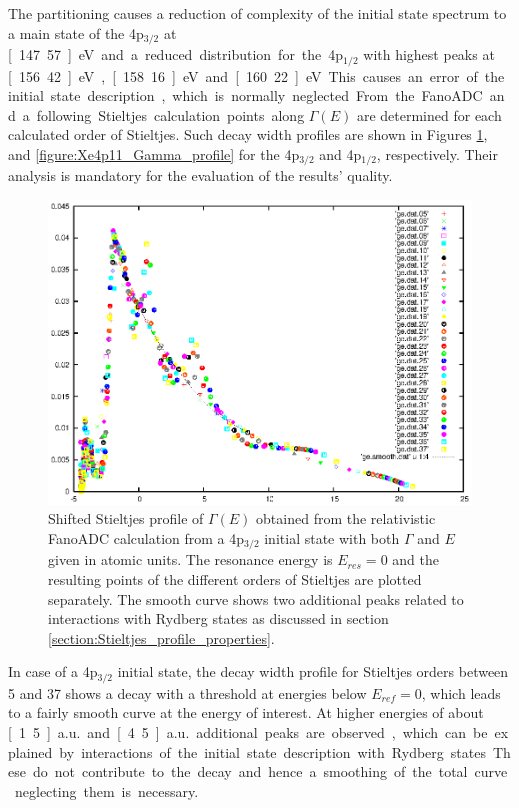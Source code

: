The partitioning causes a reduction of complexity of the initial state
spectrum to a main state of the 4p$_{3/2}$ at \unit[147.57]{eV} and a
reduced distribution for
the 4p$_{1/2}$ with highest peaks at \unit[156.42]{eV}, \unit[158.16]{eV}
and \unit[160.22]{eV}.
This causes an error of the initial state description,
which is normally neglected.

From the FanoADC and a following Stieltjes calculation points along $\Gamma(E)$ are
determined for each calculated order of Stieltjes. Such decay width profiles
are shown in Figures \ref{figure:Xe4p33_Gamma_profile},
and \ref{figure:Xe4p11_Gamma_profile}
for the 4p$_{3/2}$ and 4p$_{1/2}$, respectively.
Their analysis is mandatory for the evaluation of the results' quality.

\begin{figure}[htb]
  \centering
  \includegraphics[scale=1.15]{pics/Xe4p_33_gammae.eps}
  \caption{Shifted Stieltjes profile of $\Gamma(E)$ obtained from the
           relativistic FanoADC calculation from
           a 4p$_{3/2}$
           initial state with both $\Gamma$ and $E$ given in atomic units.
           The resonance energy is $E_{res}=0$ and the resulting points
           of the different orders of Stieltjes are plotted separately.
           The smooth curve shows two
           additional peaks related to interactions with Rydberg states as
           discussed in section \ref{section:Stieltjes_profile_properties}.
           }
  \label{figure:Xe4p33_Gamma_profile}
\end{figure}

In case of a 4p$_{3/2}$ initial state, the decay width profile for Stieltjes
orders between 5 and 37 shows a decay
with a threshold at energies below $E_{ref}=0$, which leads to a fairly smooth
curve at the energy of interest.
At higher energies of about \unit[1.5]{a.u.} and
\unit[4.5]{a.u.} additional peaks are observed, which can be explained by
interactions of the initial state description with Rydberg states. These do not
contribute to the decay and hence a smoothing of the total curve neglecting them
is necessary.


